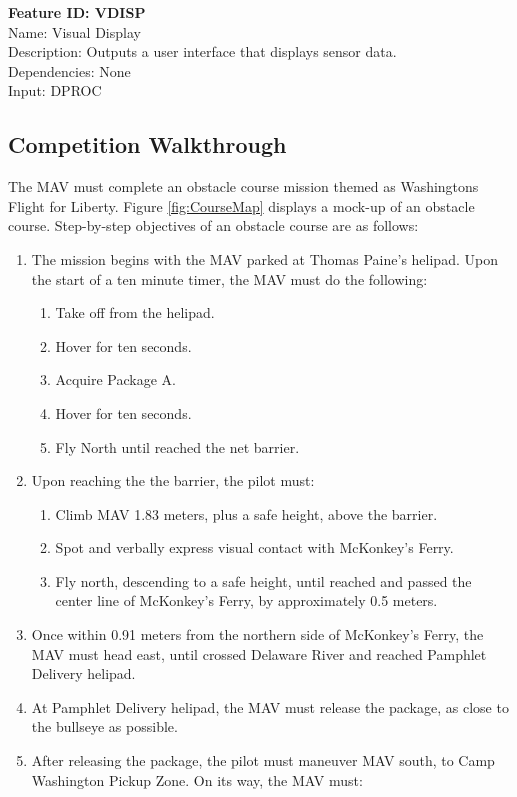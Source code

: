 \documentclass[onecolumn, oneside, letterpaper, draftclsnofoot, 10pt, compsoc]{IEEEtran}
\begin{document}
\noindent
\textbf{Feature ID: VDISP}\\
Name: Visual Display\\
Description: Outputs a user interface that displays sensor data.\\
Dependencies: None\\
Input: DPROC\\

\subsection{Competition Walkthrough}
The MAV must complete an obstacle course mission themed as Washington\textquotesingle s Flight for Liberty. Figure \ref{fig:CourseMap} displays a mock-up of an obstacle course. Step-by-step objectives of an obstacle course are as follows:
\begin{enumerate}
\item The mission begins with the MAV parked at Thomas Paine’s helipad. Upon the start of a ten minute timer, the MAV must do the following:
\begin{enumerate}
\item Take off from the helipad.
\item Hover for ten seconds.
\item Acquire Package A.
\item Hover for ten seconds.
\item Fly North until reached the net barrier.
\end{enumerate}
\item Upon reaching the the barrier, the pilot must:
\begin{enumerate}
\item Climb MAV 1.83 meters, plus a safe height, above the barrier.
\item Spot and verbally express visual contact with McKonkey’s Ferry.
\item Fly north, descending to a safe height, until reached and passed the center line of McKonkey’s Ferry, by approximately 0.5 meters.
\end{enumerate}
\item Once within 0.91 meters from the northern side of McKonkey’s Ferry, the MAV must head east, until crossed Delaware River and reached Pamphlet Delivery helipad.
\item At Pamphlet Delivery helipad, the MAV must release the package, as close to the bullseye as possible.
\item After releasing the package, the pilot must maneuver MAV south, to Camp Washington Pickup Zone. On its way, the MAV must:

\end{enumerate}
\end{document}
